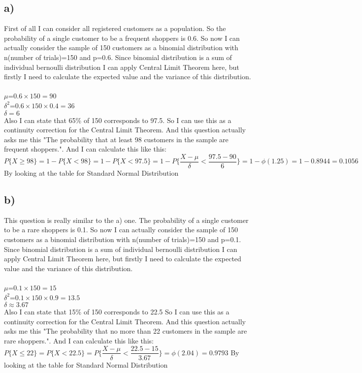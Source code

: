 \documentclass[12pt]{article}
\begin{document}
\subsection*{a)} 
First of all I can consider all registered customers as a population. So the probability of a single customer to be a frequent shoppers is 0.6. So now I can actually consider the sample of 150 customers as a binomial distribution with n(number of trials)=150 and p=0.6. Since binomial distribution is a sum of individual bernoulli distribution I can apply Central Limit Theorem here, but firstly I need to calculate the expected value and the variance of this distribution.\\\\
$\mu$=$0.6\times150=90$\\
$\delta^{2}$=$0.6\times150\times0.4=36$\\
$\delta=6$\\
Also I can state that 65\% of 150 corresponds to 97.5. So I can use this as a continuity correction for the Central Limit Theorem. And this question actually asks me this "The probability that at least 98 customers in the sample are frequent shoppers.". And I can calculate this like this:\\ $P\{X\geq98\}=1-P\{X<98\}=1-P\{X<97.5\}=1-P\{\dfrac{X-\mu}{\delta}<\dfrac{97.5-90}{6}\}=1-\phi (1.25)=1- 0.8944=0.1056$ By looking at the table for Standard Normal Distribution


\subsection*{b)}
This question is really similar to the a) one.  The probability of a single customer to be a rare shoppers is 0.1. So now I can actually consider the sample of 150 customers as a binomial distribution with n(number of trials)=150 and p=0.1. Since binomial distribution is a sum of individual bernoulli distribution I can apply Central Limit Theorem here, but firstly I need to calculate the expected value and the variance of this distribution.\\\\
$\mu$=$0.1\times150=15$\\
$\delta^{2}$=$0.1\times150\times0.9=13.5$\\
$\delta\approx3.67$\\
Also I can state that 15\% of 150 corresponds to 22.5 So I can use this as a continuity correction for the Central Limit Theorem. And this question actually asks me this "The probability that no more than 22 customers in the sample are rare shoppers.". And I can calculate this like this:\\ $P\{X\leq22\}=P\{X<22.5\}=P\{\dfrac{X-\mu}{\delta}<\dfrac{22.5-15}{3.67}\}=\phi (2.04)=0.9793$ By looking at the table for Standard Normal Distribution
\end{document}
